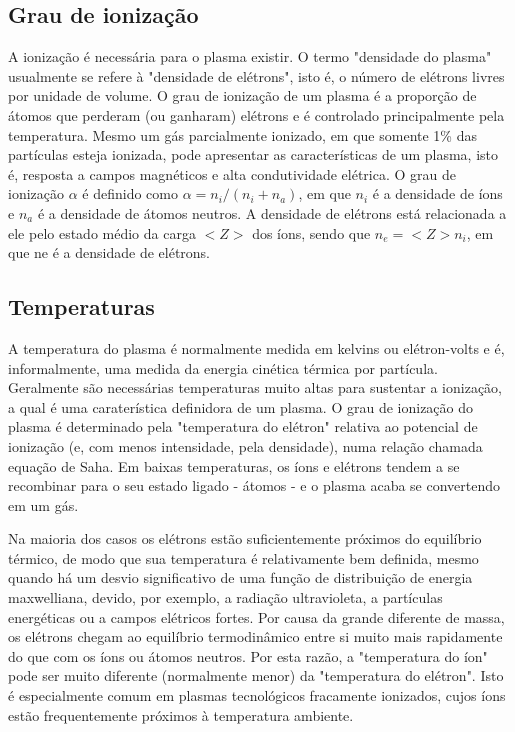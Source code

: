 \documentclass[12pt,oneside,a4paper]{abntex2}
\theoremstyle{definition}  %
\begin{document}
\subsection{Grau de ionização}
	A ionização é necessária para o plasma existir. O termo "densidade do plasma" usualmente se refere à "densidade de elétrons", isto é, o número de elétrons livres por unidade de volume. O grau de ionização de um plasma é a proporção de átomos que perderam (ou ganharam) elétrons e é controlado principalmente pela temperatura. Mesmo um gás parcialmente ionizado, em que somente 1\% das partículas esteja ionizada, pode apresentar as características de um plasma, isto é, resposta a campos magnéticos e alta condutividade elétrica. O grau de ionização $\alpha$ é definido como $\alpha = n_i/(n_i + n_a)$, em que $n_i$ é a densidade de íons e $n_a$ é a densidade de átomos neutros. A densidade de elétrons está relacionada a ele pelo estado médio da carga $<Z>$ dos íons, sendo que $n_e = <Z> n_i$, em que ne é a densidade de elétrons.
\subsection{Temperaturas}

A temperatura do plasma é normalmente medida em kelvins ou elétron-volts e é, informalmente, uma medida da energia cinética térmica por partícula. Geralmente são necessárias temperaturas muito altas para sustentar a ionização, a qual é uma caraterística definidora de um plasma. O grau de ionização do plasma é determinado pela "temperatura do elétron" relativa ao potencial de ionização (e, com menos intensidade, pela densidade), numa relação chamada equação de Saha. Em baixas temperaturas, os íons e elétrons tendem a se recombinar para o seu estado ligado - átomos - e o plasma acaba se convertendo em um gás.

Na maioria dos casos os elétrons estão suficientemente próximos do equilíbrio térmico, de modo que sua temperatura é relativamente bem definida, mesmo quando há um desvio significativo de uma função de distribuição de energia maxwelliana, devido, por exemplo, a radiação ultravioleta, a partículas energéticas ou a campos elétricos fortes. Por causa da grande diferente de massa, os elétrons chegam ao equilíbrio termodinâmico entre si muito mais rapidamente do que com os íons ou átomos neutros. Por esta razão, a "temperatura do íon" pode ser muito diferente (normalmente menor) da "temperatura do elétron". Isto é especialmente comum em plasmas tecnológicos fracamente ionizados, cujos íons estão frequentemente próximos à temperatura ambiente.
\end{document}
